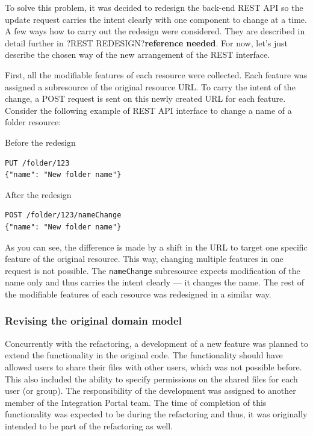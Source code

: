 \documentclass{book}
\begin{document}
To solve this problem, it was decided to redesign the back-end REST API
so the update request carries the intent clearly with one component to
change at a time. A few ways how to carry out the redesign were
considered. They are described in detail further in ?REST
REDESIGN?\textbf{reference needed}. For now, let's just describe the
chosen way of the new arrangement of the REST interface.

First, all the modifiable features of each resource were collected. Each
feature was assigned a subresource of the original resource URL. To
carry the intent of the change, a POST request is sent on this newly
created URL for each feature. Consider the following example of REST API
interface to change a name of a folder resource:

\noindent Before the redesign

\begin{lstlisting}[caption={}]
PUT /folder/123
{"name": "New folder name"}
\end{lstlisting}

\noindent After the redesign

\begin{lstlisting}[caption={}]
POST /folder/123/nameChange
{"name": "New folder name"}
\end{lstlisting}

As you can see, the difference is made by a shift in the URL to target
one specific feature of the original resource. This way, changing
multiple features in one request is not possible. The
\texttt{nameChange} subresource expects modification of the name only
and thus carries the intent clearly --- it changes the name. The rest of
the modifiable features of each resource was redesigned in a similar
way.

\subsubsection{Revising the original domain
model}\label{revising-the-original-domain-model}

Concurrently with the refactoring, a development of a new feature was
planned to extend the functionality in the original code. The
functionality should have allowed users to share their files with other
users, which was not possible before. This also included the ability to
specify permissions on the shared files for each user (or group). The
responsibility of the development was assigned to another member of the
Integration Portal team. The time of completion of this functionality
was expected to be during the refactoring and thus, it was originally
intended to be part of the refactoring as well.
\end{document}
